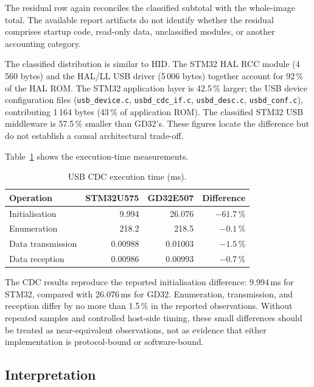 The residual row again reconciles the classified subtotal with the whole-image total. The
available report artifacts do not identify whether the residual comprises startup code,
read-only data, unclassified modules, or another accounting category.

The classified distribution is similar to HID. The STM32 HAL RCC module (4\,560 bytes) and the
HAL/LL USB driver (5\,006 bytes) together account for 92\,\% of the HAL ROM.
The STM32 application layer is 42.5\,\% larger; the USB device configuration files
(\texttt{usb\_device.c}, \texttt{usbd\_cdc\_if.c},
\texttt{usbd\_desc.c}, \texttt{usbd\_conf.c}), contributing 1\,164 bytes (43\,\% of
application ROM). The classified STM32 USB middleware is 57.5\,\% smaller than GD32's.
These figures locate the difference but do not establish a causal architectural trade-off.

Table~\ref{tab:gd32-usb-cdc-exec} shows the execution-time measurements.

\begin{table}[H]
  \centering
  \caption{USB CDC execution time (ms).}
  \label{tab:gd32-usb-cdc-exec}
  \begin{tabular}{l r r r}
    \toprule
    \textbf{Operation} & \textbf{STM32U575} & \textbf{GD32E507} & \textbf{Difference} \\
    \midrule
    Initialisation      & 9.994   & 26.076 & $-61.7\,\%$ \\
    Enumeration         & 218.2   & 218.5  & $-0.1\,\%$ \\
    Data transmission   & 0.00988 & 0.01003 & $-1.5\,\%$ \\
    Data reception      & 0.00986 & 0.00993 & $-0.7\,\%$ \\
    \bottomrule
  \end{tabular}
\end{table}

The CDC results reproduce the reported initialisation difference: 9.994\,ms for STM32,
compared with 26.076\,ms for GD32. Enumeration, transmission, and reception differ by no
more than 1.5\,\% in the reported observations. Without repeated samples and controlled
host-side timing, these small differences should be treated as near-equivalent observations,
not as evidence that either implementation is protocol-bound or software-bound.

\subsection{Interpretation}
\label{sec:gd32-usb-interp}

